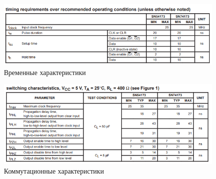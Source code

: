 \begin{figure}[H]
	\centering
	\includegraphics[width=0.95\linewidth]{imgs/10/10_timing}
	\caption{Временные характеристики}
	\label{fig:10_timing}
\end{figure}

\begin{figure}[H]
	\centering
	\includegraphics[width=0.95\linewidth]{imgs/10/10_switch}
	\caption{Коммутационные характеристики}
	\label{fig:10_switch}
\end{figure}